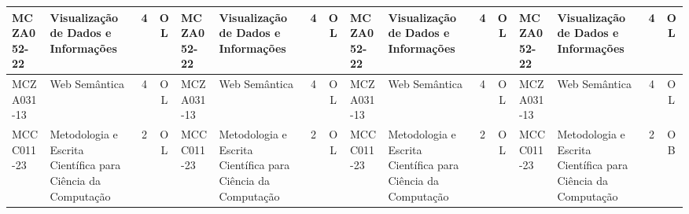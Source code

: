 \documentclass[a4paper]{article}
\begin{document}
\begin{landscape}
{\begin{longtable}{|l|p{.15\textheight}|c|c||l|p{.15\textheight}|c|c||l|p{.15\textheight}|c|c||l|p{.15\textheight}|c|c|}
    MCZA052-22 & Visualização de Dados e Informações & 4 & OL &
    MCZA052-22 & Visualização de Dados e Informações & 4 & OL &
    MCZA052-22 & Visualização de Dados e Informações & 4 & OL &
    MCZA052-22 & Visualização de Dados e Informações & 4 & OL \\ \hline

    MCZA031-13 & Web Semântica & 4 & OL &
    MCZA031-13 & Web Semântica & 4 & OL &
    MCZA031-13 & Web Semântica & 4 & OL &
    MCZA031-13 & Web Semântica & 4 & OL \\ \hline

    MCCC011-23 & Metodologia e Escrita Científica para Ciência da Computação & 2 & OL &
    MCCC011-23 & Metodologia e Escrita Científica para Ciência da Computação & 2 & OL &
    MCCC011-23 & Metodologia e Escrita Científica para Ciência da Computação & 2 & OL &
    MCCC011-23 & Metodologia e Escrita Científica para Ciência da Computação & 2 & OB\\ \hline

\end{longtable}
}
\end{landscape}



    


\end{document}
